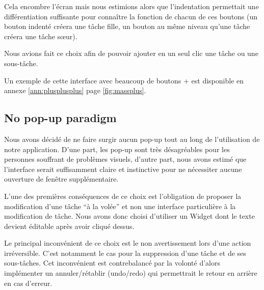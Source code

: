 \documentclass[11pt]{article}
\begin{document}
Cela encombre l'écran mais nous estimions alors que l'indentation
permettait une différentiation suffisante pour connaître la fonction
de chacun de ces boutons (un bouton indenté créera une tâche fille, un
bouton au même niveau qu'une tâche créera une tâche sœur).

Nous avions fait ce choix afin de pouvoir ajouter en un seul clic une
tâche ou une sous-tâche.

Un exemple de cette interface avec beaucoup de boutons + est
disponible en annexe \ref{ann:plusplusplus} page \ref{fig:massplus}.




\subsection{No pop-up paradigm}

Nous avons décidé de ne faire surgir aucun pop-up tout au long de
l'utilisation de notre application. D'une part, les pop-up sont très
désagréables pour les personnes souffrant de problèmes visuels,
d'autre part, nous avons estimé que l'interface serait suffisamment
claire et instinctive pour ne nécessiter aucune ouverture de fenêtre
supplémentaire.

L'une des premières conséquences de ce choix est l'obligation de
proposer la modification d'une tâche ``à la volée'' et non une
interface particulière à la modification de tâche. Nous avons donc
choisi d'utiliser un Widget dont le texte devient éditable après avoir
cliqué dessus.

Le principal inconvénient de ce choix est le non avertissement lors
d'une action irréversible. C'est notamment le cas pour la suppression
d'une tâche et de ses sous-tâches. Cet inconvénient est contrebalancé
par la volonté d'alors implémenter un annuler/rétablir (undo/redo) qui
permettrait le retour en arrière en cas d'erreur.



\end{document}
